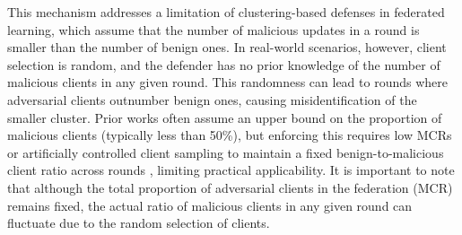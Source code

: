 This mechanism addresses a limitation of clustering-based defenses in federated learning, which assume that the number of malicious updates in a round is smaller than the number of benign ones. In real-world scenarios, however, client selection is random, and the defender has no prior knowledge of the number of malicious clients in any given round. This randomness can lead to rounds where adversarial clients outnumber benign ones, causing misidentification of the smaller cluster.
Prior works often assume an upper bound on the proportion of malicious clients (typically less than 50\%), but enforcing this requires low MCRs or artificially controlled client sampling  to maintain a fixed benign-to-malicious client ratio across rounds \citep{zhang2023flip}, limiting practical applicability.
It is important to note that although the total proportion of adversarial clients in the federation (MCR) remains fixed, the actual ratio of malicious clients in any given round can fluctuate due to the random selection of clients.

